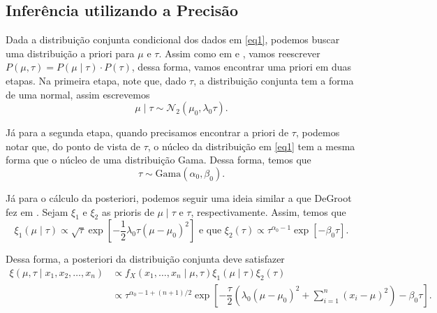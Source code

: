 \documentclass{article}
\begin{document}
\subsection*{Inferência utilizando a Precisão}

Dada a distribuição conjunta condicional dos dados em \ref{eq1}, podemos buscar uma distribuição a priori para $\mu$ e $\tau$. Assim como em \cite{ehlers} e \cite{ehlers2}, vamos reescrever $P(\mu, \tau) = P(\mu \mid \tau)\cdot P(\tau)$, dessa forma, vamos encontrar uma priori em duas etapas. Na primeira etapa, note que, dado $\tau$, a distribuição conjunta tem a forma de uma normal, assim escrevemos
\[\mu \mid \tau \sim \mathcal{N}_2(\mu_0, \lambda_0 \tau).\]

Já para a segunda etapa, quando precisamos encontrar a priori de $\tau$, podemos notar que, do ponto de vista de $\tau$, o núcleo da distribuição em \ref{eq1} tem a mesma forma que o núcleo de uma distribuição Gama. Dessa forma, temos que
\[\tau \sim \text{Gama}\left(\alpha_0, \beta_0\right).\]

Já para o cálculo da posteriori, podemos seguir uma ideia similar a que DeGroot fez em \cite{degroot}. Sejam $\xi_1$ e $\xi_2$ as prioris de $\mu \mid \tau$ e $\tau$, respectivamente. Assim, temos que
\[\xi_1(\mu \mid \tau) \propto \sqrt{\tau} \exp{\left[-\dfrac{1}{2}\lambda_0 \tau (\mu - \mu_0)^2\right]} \text{ e que } \xi_2(\tau) \propto \tau^{\alpha_0 - 1} \exp{\left[- \beta_0 \tau\right]}.\]

Dessa forma, a posteriori da distribuição conjunta deve satisfazer
\begin{equation}
    \label{post1}
    \begin{split}
        \xi(\mu, \tau \mid x_1, x_2, \dots, x_n) & \propto f_X(x_1, \dots, x_n \mid \mu, \tau) \xi_1(\mu \mid \tau) \xi_2(\tau) \\
        & \propto \tau^{\alpha_0 - 1 + (n + 1)/2} \exp{\left[-\dfrac{\tau}{2}\left(\lambda_0 (\mu - \mu_0)^2 + \sum_{i = 1}^{n}\left(x_i - \mu\right)^2\right) - \beta_0 \tau\right]}.
    \end{split}
\end{equation}
\end{document}
